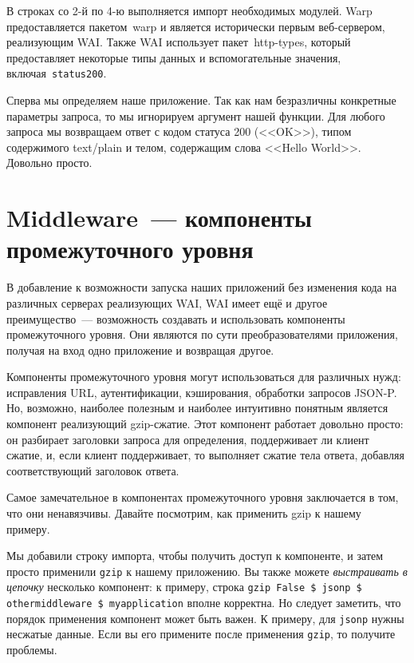 
В строках со 2-й по 4-ю выполняется импорт необходимых модулей. Warp
предоставляется пакетом~warp и является исторически первым веб-сервером,
реализующим WAI. Также WAI использует пакет~http-types, который предоставляет
некоторые типы данных и вспомогательные значения,
включая~\lstinline!status200!.

Сперва мы определяем наше приложение. Так как нам безразличны конкретные
параметры запроса, то мы игнорируем аргумент нашей функции. Для любого запроса
мы возвращаем ответ с кодом статуса 200 (<<OK>>), типом содержимого text/plain
и телом, содержащим слова <<Hello World>>. Довольно просто.

\section {Middleware~--- компоненты промежуточного уровня}

В добавление к возможности запуска наших приложений без изменения кода на
различных серверах реализующих WAI, WAI имеет ещё и другое преимущество~---
возможность создавать и использовать компоненты промежуточного уровня. Они
являются по сути преобразователями приложения, получая на вход одно приложение
и возвращая другое.

Компоненты промежуточного уровня могут использоваться для различных нужд:
исправления URL, аутентификации, кэширования, обработки запросов JSON-P. Но,
возможно, наиболее полезным и наиболее интуитивно понятным является компонент
реализующий gzip-сжатие. Этот компонент работает довольно просто: он разбирает
заголовки запроса для определения, поддерживает ли клиент сжатие, и, если
клиент поддерживает, то выполняет сжатие тела ответа, добавляя соответствующий
заголовок ответа.

Самое замечательное в компонентах промежуточного уровня заключается в том, что
они ненавязчивы. Давайте посмотрим, как применить gzip к нашему примеру.


Мы добавили строку импорта, чтобы получить доступ к компоненте, и затем просто
применили \lstinline!gzip!  к нашему приложению. Вы также можете
\emph{выстраивать в цепочку} несколько компонент: к примеру, строка
\lstinline'gzip False $ jsonp $ othermiddleware $ myapplication' вполне
корректна. Но следует заметить, что порядок применения компонент может быть
важен. К примеру, для \lstinline!jsonp! нужны несжатые данные. Если вы его
примените после применения \lstinline!gzip!, то получите проблемы.
